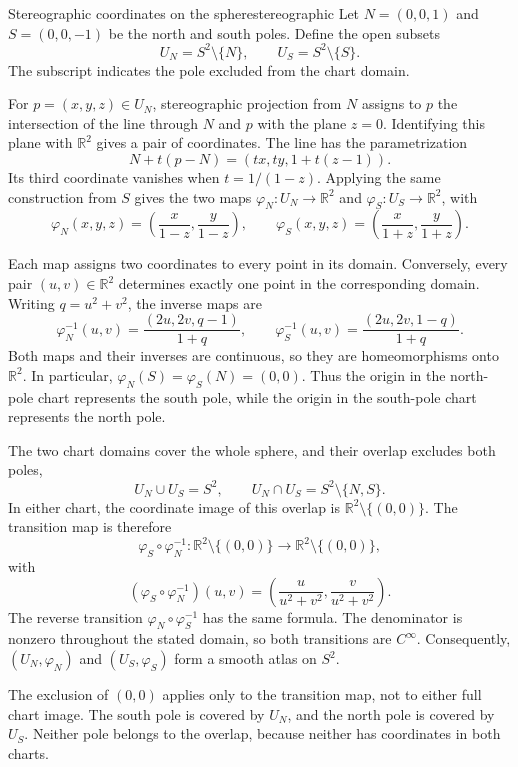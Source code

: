 \documentclass[11pt,a4paper]{article}
\numberwithin{equation}{section}
\newcommand{\R}{\mathbb R}
\begin{document}
\begin{examplebox}{Stereographic coordinates on the sphere}{stereographic}
Let \(N=(0,0,1)\) and \(S=(0,0,-1)\) be the north and south poles.
Define the open subsets
\[
 U_N=S^2\setminus\{N\},
 \qquad
 U_S=S^2\setminus\{S\}.
\]
The subscript indicates the pole excluded from the chart domain.

For \(p=(x,y,z)\in U_N\), stereographic projection from \(N\) assigns
to \(p\) the intersection of the line through \(N\) and \(p\) with
the plane \(z=0\). Identifying this plane with \(\R^2\) gives a pair
of coordinates. The line has the parametrization
\[
 N+t(p-N)=(tx,ty,1+t(z-1)).
\]
Its third coordinate vanishes when \(t=1/(1-z)\). Applying the same
construction from \(S\) gives the two maps
\(\varphi_N:U_N\to\R^2\) and \(\varphi_S:U_S\to\R^2\), with
\[
 \varphi_N(x,y,z)=\left(\frac{x}{1-z},\frac{y}{1-z}\right),
 \qquad
 \varphi_S(x,y,z)=\left(\frac{x}{1+z},\frac{y}{1+z}\right).
\]

Each map assigns two coordinates to every point in its domain.
Conversely, every pair \((u,v)\in\R^2\) determines exactly one point
in the corresponding domain. Writing \(q=u^2+v^2\), the inverse maps
are
\[
 \varphi_N^{-1}(u,v)=\frac{(2u,2v,q-1)}{1+q},
 \qquad
 \varphi_S^{-1}(u,v)=\frac{(2u,2v,1-q)}{1+q}.
\]
Both maps and their inverses are continuous, so they are
homeomorphisms onto \(\R^2\). In particular,
\(\varphi_N(S)=\varphi_S(N)=(0,0)\). Thus the origin in the
north-pole chart represents the south pole, while the origin in
the south-pole chart represents the north pole.

The two chart domains cover the whole sphere, and their overlap
excludes both poles,
\[
 U_N\cup U_S=S^2,
 \qquad
 U_N\cap U_S=S^2\setminus\{N,S\}.
\]
In either chart, the coordinate image of this overlap is
\(\R^2\setminus\{(0,0)\}\). The transition map is therefore
\[
 \varphi_S\circ\varphi_N^{-1}:
 \R^2\setminus\{(0,0)\}\longrightarrow\R^2\setminus\{(0,0)\},
\]
with
\[
 (\varphi_S\circ\varphi_N^{-1})(u,v)
 =\left(\frac{u}{u^2+v^2},\frac{v}{u^2+v^2}\right).
\]
The reverse transition \(\varphi_N\circ\varphi_S^{-1}\) has the same
formula. The denominator is nonzero throughout the stated domain,
so both transitions are \(C^\infty\). Consequently,
\((U_N,\varphi_N)\) and \((U_S,\varphi_S)\) form a smooth atlas on
\(S^2\).
\end{examplebox}

The exclusion of \((0,0)\) applies only to the transition map, not
to either full chart image. The south pole is covered by \(U_N\),
and the north pole is covered by \(U_S\). Neither pole belongs to
the overlap, because neither has coordinates in both charts.
\end{document}
